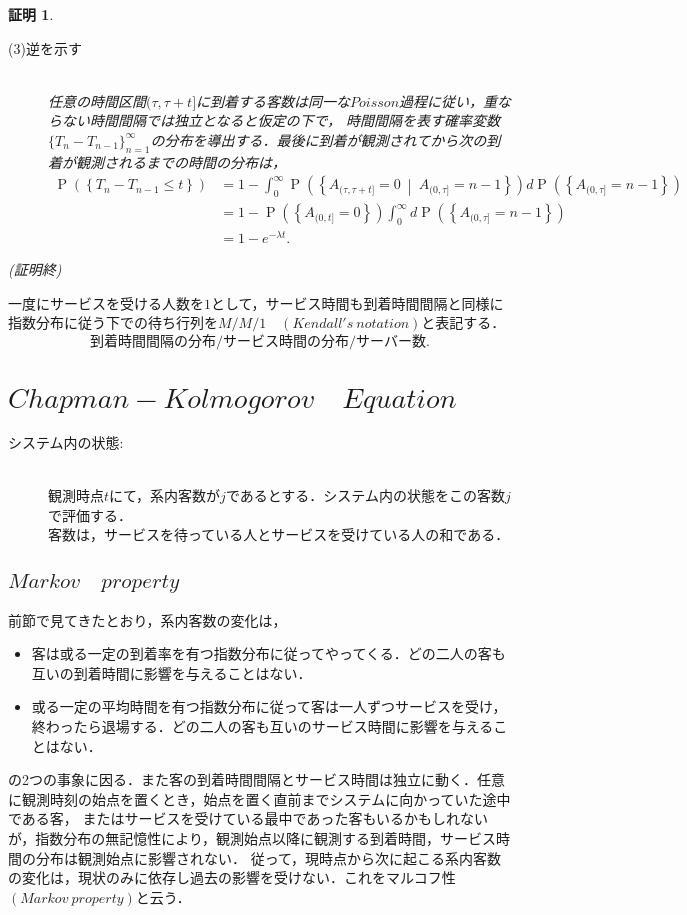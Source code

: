 \documentclass[a4j,papersize,disablejfam,slide,14pt]{jsarticle}
\newtheorem{Proof}{証明}
\def\qed{{(証明終)}} %
\def\exp#1{e^{#1}} %
\def\prob#1{\operatorname{P} \left(\left\{ #1 \right\}\right)} %
\def\cprob#1#2{\operatorname{P} \left(\left\{ #1 \ \middle|\ #2 \right\}\right)} %
\begin{document}
\begin{Proof}
\begin{description}
            \item[(3)逆を示す]\mbox{}\\
            	任意の時間区間$(\tau, \tau + t]$に到着する客数は同一な$Poisson$過程に従い，重ならない時間間隔では独立となると仮定の下で，
                時間間隔を表す確率変数$\{T_n - T_{n-1}\}_{n=1}^{\infty}$の分布を導出する．最後に到着が観測されてから次の到着が観測されるまでの時間の分布は，
                \begin{align}
                	\prob{T_n - T_{n-1} \leq t} &= 1 - \int_{0}^{\infty} \cprob{A_{(\tau, \tau+t]} = 0}{A_{(0, \tau]} = n-1} d\prob{A_{(0, \tau]} = n-1} \\
                    &= 1 - \prob{A_{(0, t]} = 0} \int_{0}^{\infty} d\prob{A_{(0, \tau]} = n-1} \\
                    &= 1 - \exp{-\lambda t}.
                \end{align}
    	\end{description}
        \qed
    \end{Proof}
    一度にサービスを受ける人数を$1$として，サービス時間も到着時間間隔と同様に指数分布に従う下での待ち行列を$M/M/1 \quad (Kendall's\ notation)$と表記する．\\
    \[
    	\mbox{到着時間間隔の分布} / \mbox{サービス時間の分布} / \mbox{サーバー数}.
    \]

\section{$Chapman-Kolmogorov\quad Equation$}
    \begin{description}
		\item[システム内の状態:]\mbox{}\\
        	観測時点$t$にて，系内客数が$j$であるとする．システム内の状態をこの客数$j$で評価する．\\
            客数は，サービスを待っている人とサービスを受けている人の和である．
    \end{description}
\subsection{$Markov\quad property$}
\label{sec:Markov_property}
	前節で見てきたとおり，系内客数の変化は，
    \begin{itemize}
    	\item 客は或る一定の到着率を有つ指数分布に従ってやってくる．どの二人の客も互いの到着時間に影響を与えることはない．
    	\item 或る一定の平均時間を有つ指数分布に従って客は一人ずつサービスを受け，終わったら退場する．どの二人の客も互いのサービス時間に影響を与えることはない．
    \end{itemize}
    の2つの事象に因る．また客の到着時間間隔とサービス時間は独立に動く．任意に観測時刻の始点を置くとき，始点を置く直前までシステムに向かっていた途中である客，
    またはサービスを受けている最中であった客もいるかもしれないが，指数分布の無記憶性により，観測始点以降に観測する到着時間，サービス時間の分布は観測始点に影響されない．
    従って，現時点から次に起こる系内客数の変化は，現状のみに依存し過去の影響を受けない．これをマルコフ性$(Markov\ property)$と云う．
\end{document}
